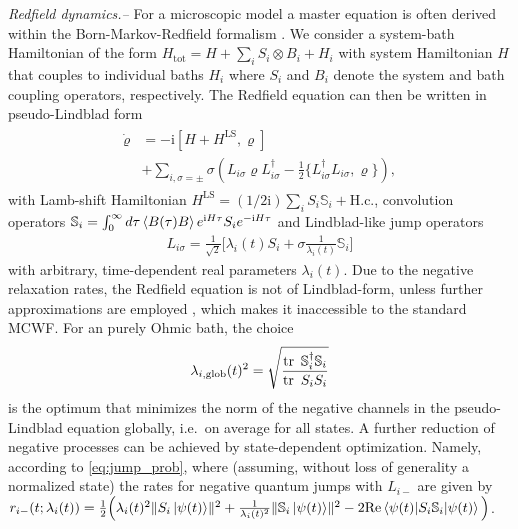 \documentclass[twocolumn,prl,superscriptaddress]{revtex4-2}
\renewcommand{\i}{\mathrm i}
\begin{document}
\textit{Redfield dynamics.--} For a microscopic model a master equation is often derived within the Born-Markov-Redfield formalism \cite{Strunz20,Archak22}. We consider a system-bath Hamiltonian of the form $H_\mathrm{tot} = H + \sum_i S_i \otimes B_i + H_i$ with system Hamiltonian $H$ that couples to individual baths $H_i$ where $S_i$ and $B_i$ denote the system and bath coupling operators, respectively. The Redfield equation can then be written in pseudo-Lindblad form \cite{TBecker2021}
\begin{align}
	\begin{aligned}
	\dot \varrho &= - \i[H + H^{\mathrm{LS}}, \varrho] \\ &+  \sum\limits_{i,\sigma=\pm} \sigma \left( L_{i\sigma} \varrho L_{i\sigma}^\dagger - \frac{1}{2} \{ L_{i\sigma}^\dagger L_{i\sigma},\varrho \} \right) ,
	\end{aligned}
\end{align}
with Lamb-shift Hamiltonian $H^\mathrm{LS}= (1/2\i) \sum_i S_i\mathbb{S}_i + \text{H.c.}$, convolution operators $\mathbb{S}_i=\int_0^\infty  d \tau \expval{B(\tau)B} e^{\mathrm{i}H \tau} S_i e^{-\i H \tau}$ and Lindblad-like jump operators
\begin{align}
	L_{i\sigma} = \frac{1}{\sqrt 2} \Bigg[ \lambda_{i}(t) S_i + \sigma \frac{1}{\lambda_{i}(t)} \mathbb{S}_i \Bigg]
\end{align} 
with arbitrary, time-dependent real parameters $\lambda_{i}(t)$. Due to the negative relaxation rates, the Redfield equation is not of Lindblad-form, unless further approximations are employed \cite{TBecker2021,breuerpetruccione,Archak22,Strunz20}, which makes it inaccessible to the standard MCWF. For an purely Ohmic bath, the choice~\cite{TBecker2021}
\begin{align}
	\lambda_{i, \mathrm{glob}}(t)^2 = \sqrt \frac{\tr\ \mathbb{S}_i^\dagger \mathbb{S}_i}{\tr\ S_i S_i}
\end{align}
is the optimum that minimizes the norm of the negative channels in the pseudo-Lindblad equation globally, i.e.~on average for all states. A further reduction of negative processes can be achieved by state-dependent optimization. Namely, according to \cref{eq:jump_prob}, where (assuming, without loss of generality a normalized state) the rates for negative quantum jumps with $L_{i-}$ are given by $	r_{i-}(t;\lambda_i(t)) = \frac{1}{2} \Big( \lambda_i(t)^2 \lVert S_i \ket{\psi(t)}\rVert^2 + \frac{1}{\lambda_i(t)^2} \lVert \mathbb{S}_i \ket{\psi(t)}\rVert^2 - 2\mathrm{Re} \expval{S_i \mathbb{S}_i}{\psi(t)}  \Big)$.
\end{document}
